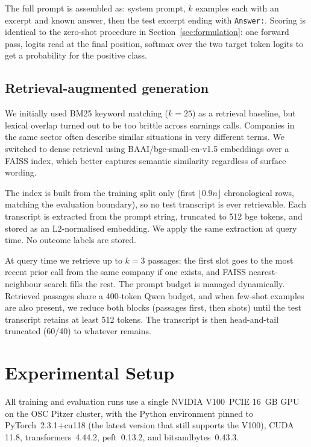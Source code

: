\documentclass[11pt]{article}
\begin{document}
The full prompt is assembled as: system prompt, $k$ examples each with an excerpt and known answer, then the test excerpt ending with \texttt{Answer:}. Scoring is identical to the zero-shot procedure in Section~\ref{sec:formulation}: one forward pass, logits read at the final position, softmax over the two target token logits to get a probability for the positive class.

\subsection{Retrieval-augmented generation}
\label{sec:rag}

We initially used BM25 keyword matching ($k=25$) as a retrieval
baseline, but lexical overlap turned out to be too brittle across
earnings calls. Companies in the same sector often describe similar
situations in very different terms. We switched to dense retrieval
using BAAI/bge-small-en-v1.5 embeddings over a FAISS index, which
better captures semantic similarity regardless of surface wording.

The index is built from the training split only (first
$\lfloor 0.9n \rfloor$ chronological rows, matching the evaluation
boundary), so no test transcript is ever retrievable. Each transcript
is extracted from the prompt string, truncated to 512 bge tokens, and
stored as an L2-normalised embedding. We apply the same extraction at
query time. No outcome labels are stored.

At query time we retrieve up to $k=3$ passages: the first slot goes
to the most recent prior call from the same company if one exists,
and FAISS nearest-neighbour search fills the rest. The prompt budget
is managed dynamically. Retrieved passages share a 400-token Qwen
budget, and when few-shot examples are also present, we reduce both
blocks (passages first, then shots) until the test transcript retains
at least 512 tokens. The transcript is then head-and-tail truncated
(60/40) to whatever remains.

\section{Experimental Setup}
\label{sec:setup}

All training and evaluation runs use a single NVIDIA V100~PCIE 16~GB
GPU on the OSC Pitzer cluster, with the Python environment pinned to
PyTorch~2.3.1+cu118 (the latest version that still supports the
V100), CUDA 11.8, transformers~4.44.2, peft~0.13.2, and
bitsandbytes~0.43.3.
\end{document}
